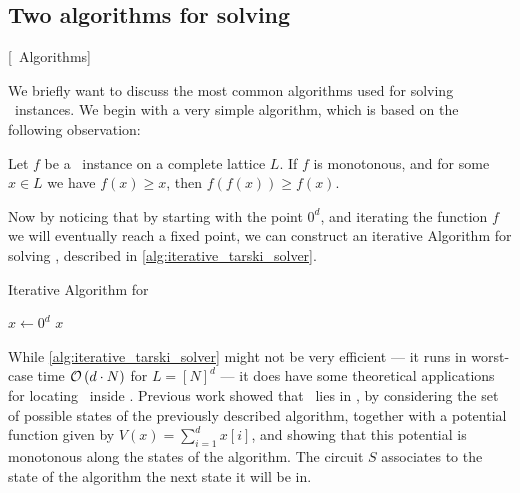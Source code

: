 \subsection{Two algorithms for solving \Tarski}[\Tarski\ Algorithms]
\label{sec:tarski_algorithms}

We briefly want to discuss the most common algorithms used for solving \Tarski\ instances. We begin with a very simple algorithm, which is based on the following observation:
\begin{remark}
    Let $f$ be a \Tarski\ instance on a complete lattice $L$. If $f$ is monotonous, and for some $x \in L$ we have $f(x) \geq x$, then $f(f(x)) \geq f(x)$.
\end{remark}
Now by noticing that by starting with the point $0^d$, and iterating the function $f$ we will eventually reach a fixed point, we can construct an iterative Algorithm for solving \Tarski, described in \cref{alg:iterative_tarski_solver}.

\begin{algorithm}
    \caption{Iterative Algorithm for \Tarski}
    \label{alg:iterative_tarski_solver}
    $x \leftarrow 0^d$ \;
    \Return $x$ \;
\end{algorithm}

While \cref{alg:iterative_tarski_solver} might not be very efficient --- it runs in worst-case time $\mathcal{O}\left(d \cdot N\right)$ for $L = [N]^d$ --- it does have some theoretical applications for locating \Tarski\ inside \TFNP. Previous work  showed that \Tarski\ lies in \PLS, by considering the set of possible states of the previously described algorithm, together with a potential function given by $V(x) = \sum_{i=1}^{d}{x[i]}$, and showing that this potential is monotonous along the states of the algorithm. The circuit $S$ associates to the state of the algorithm the next state it will be in.

